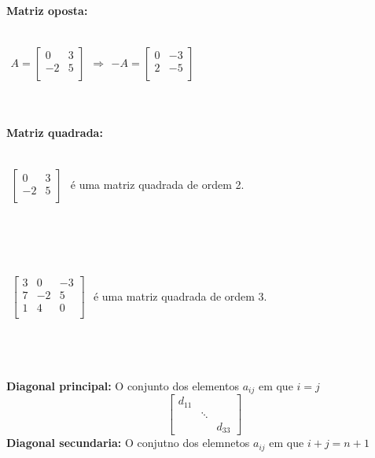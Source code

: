 \documentclass[15pt]{article}
\begin{document}
\\
\textbf{Matriz oposta:}\\
\\
\centerline{
$\begin{matrix}
A=
\begin{bmatrix}
0 & 3\\
-2 & 5\\
\end{bmatrix}
\end{matrix}
\Rightarrow
\begin{matrix}
-A=
\begin{bmatrix}
0 & -3\\
2 & -5\\
\end{bmatrix}
\end{matrix}$
}\\
\\
\textbf{Matriz quadrada:}
\\
\\
\centerline{
$\begin{matrix}
\begin{bmatrix}
0 & 3\\
-2 & 5\\
\end{bmatrix}
\end{matrix}$
é uma matriz quadrada de ordem 2.
}\\\\\\
\centerline{
$\begin{matrix}
\begin{bmatrix}
3 & 0 & -3\\
7 & -2 & 5\\
1 & 4 & 0\\
\end{bmatrix}
\end{matrix}$
é uma matriz quadrada de ordem 3.
}
\\
\\\\
\textbf{Diagonal principal:}
O conjunto dos elementos $a_{ij}$ em que $i=j$
\\
\[
  \begin{bmatrix}
    d_{11} & & \\
    & \ddots & \\
    & & d_{33}
  \end{bmatrix}
\]
\textbf{Diagonal secundaria:}
O conjutno dos elemnetos $a_{ij}$ em que $i+j=n+1$
\end{document}
